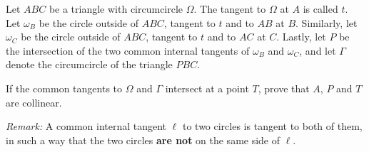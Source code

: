 Let $ABC$ be a triangle with circumcircle $\Omega$.
The tangent to $\Omega$ at $A$ is called $t$.
Let $\omega_B$ be the circle outside of $ABC$, tangent to $t$ and to $AB$ at $B$.
Similarly, let $\omega_C$ be the circle outside of $ABC$, tangent to $t$ and to $AC$ at $C$.
Lastly, let $P$ be the intersection of the two common internal tangents
of $\omega_B$ and $\omega_C$, and let $\Gamma$ denote the circumcircle of the triangle $PBC$.

If the common tangents to $\Omega$ and $\Gamma$ intersect at a point $T$,
prove that $A$, $P$ and $T$ are collinear.

\emph{Remark:} A common internal tangent $\ell$ to two circles is tangent to both of them,
in such a way that the two circles \textbf{are not} on the same side of $\ell$.
